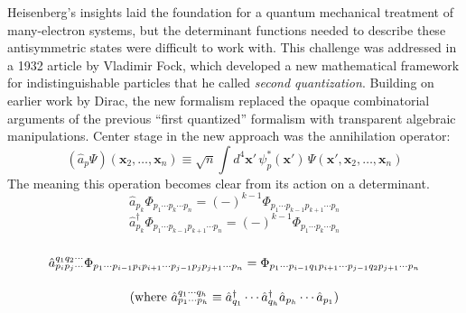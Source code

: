 Heisenberg's insights laid the foundation for a quantum mechanical treatment of
many-electron systems,\cite{Heisenberg:1926p411} but the determinant functions
needed to describe these antisymmetric states were difficult to work with.
This challenge was addressed in a 1932 article by Vladimir Fock, which developed
a new mathematical framework for indistinguishable particles that he called
{\itshape second quantization}.\cite{Fock:1932p622}
Building on earlier work by Dirac,\cite{Dirac:1927p243} the new formalism
replaced the opaque combinatorial arguments of the previous ``first quantized''
formalism with transparent algebraic manipulations.
Center stage in the new approach was the annihilation operator:
\begin{equation}
    (\hat{a}_p\Psi)(\mathbf{x}_2, \ldots, \mathbf{x}_n)
    \equiv
    \sqrt{n}
    \int
    d^4\mathbf{x}'\,
    \psi_p^*(\mathbf{x}')\,
    \Psi(\mathbf{x}', \mathbf{x}_2, \ldots, \mathbf{x}_n)
\end{equation}
The meaning this operation becomes clear from its action on a determinant.
\begin{equation}
    \hat{a}_{p_k}
    \Phi_{p_1\cdots p_k \cdots p_n}
    =
    (-)^{k-1}
    \Phi_{p_1\cdots p_{k-1} p_{k+1}\cdots p_n}
\end{equation}
\begin{equation}
    \hat{a}_{p_k}^\dagger
    \Phi_{p_1\cdots p_{k-1} p_{k+1}\cdots p_n}
    =
    (-)^{k-1}
    \Phi_{p_1\cdots p_k\cdots p_n}
\end{equation}
\begin{equation}
    \begin{array}{c}
        \\
        \hat{a}^{q_1q_2\cdots}_{p_ip_j\cdots}
        \Phi_{%
            p_1\cdots
            p_{i-1} p_i p_{i+1}\cdots
            p_{j-1} p_j p_{j+1}\cdots
            p_n
        }
        =
        \Phi_{%
            p_1\cdots
            p_{i-1} q_1 p_{i+1}\cdots
            p_{j-1} q_2 p_{j+1}\cdots
            p_n
        }
        \\[15pt]
        \text{
            \hfill
            (%
                where
                \(
                    \hat{a}^{q_1\cdots q_h}_{p_1\cdots p_h}
                    \equiv
                    \hat{a}_{q_1}^\dagger
                    \cdots
                    \hat{a}_{q_h}^\dagger
                    \hat{a}_{p_h}
                    \cdots
                    \hat{a}_{p_1}
                \)%
            )
        }
        \\[15pt]
    \end{array}
\end{equation}
